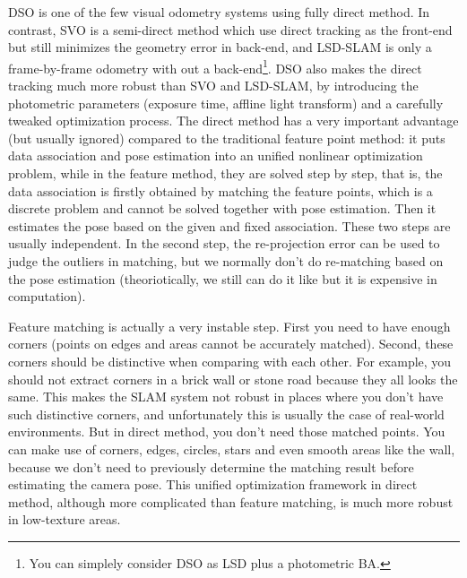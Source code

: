\documentclass[a4paper,10pt]{article}
\begin{document}
	DSO is one of the few visual odometry systems using fully direct method. In contrast, SVO \cite{forster2014svo} is a semi-direct method which use direct tracking as the front-end but still minimizes the geometry error in back-end, and LSD-SLAM \cite{engel2014lsd} is only a frame-by-frame odometry with out a back-end\footnote{You can simplely consider DSO as LSD plus a photometric BA.}. DSO also makes the direct tracking much more robust than SVO and LSD-SLAM, by introducing the photometric parameters (exposure time, affline light transform) and a carefully tweaked optimization process. The direct method has a very important advantage (but usually ignored) compared to the traditional feature point method: it puts data association and pose estimation into an unified nonlinear optimization problem, while in the feature method, they are solved step by step, that is, the data association is firstly obtained by matching the feature points, which is a discrete problem and cannot be solved together with pose estimation. Then it estimates the pose based on the given and fixed association. These two steps are usually independent. In the second step, the re-projection error can be used to judge the outliers in matching, but we normally don't do re-matching based on the pose estimation (theoriotically, we still can do it like \cite{bowman2017probabilistic} but it is expensive in computation). 
	
	Feature matching is actually a very instable step. First you need to have enough corners (points on edges and areas cannot be accurately matched). Second, these corners should be distinctive when comparing with each other. For example, you should not extract corners in a brick wall or stone road because they all looks the same. This makes the SLAM system not robust in places where you don't have such distinctive corners, and unfortunately this is usually the case of real-world environments. But in direct method, you don't need those matched points. You can make use of corners, edges, circles, stars and even smooth areas like the wall, because we don't need to previously determine the matching result before estimating the camera pose. This unified optimization framework in direct method, although more complicated than feature matching, is much more robust in low-texture areas. 
	
\end{document}
